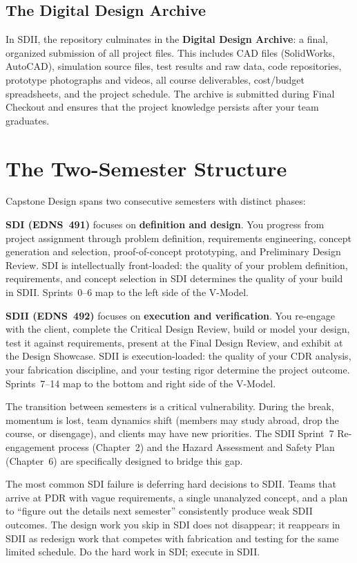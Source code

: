 \subsection{The Digital Design Archive}
In SDII, the repository culminates in the \textbf{Digital Design Archive}: a final, organized submission of all project files. This includes CAD files (SolidWorks, AutoCAD), simulation source files, test results and raw data, code repositories, prototype photographs and videos, all course deliverables, cost/budget spreadsheets, and the project schedule. The archive is submitted during Final Checkout and ensures that the project knowledge persists after your team graduates.


\section{The Two-Semester Structure}
Capstone Design spans two consecutive semesters with distinct phases:

\textbf{SDI (EDNS~491)} focuses on \textbf{definition and design}. You progress from project assignment through problem definition, requirements engineering, concept generation and selection, proof-of-concept prototyping, and Preliminary Design Review. SDI is intellectually front-loaded: the quality of your problem definition, requirements, and concept selection in SDI determines the quality of your build in SDII. Sprints~0--6 map to the left side of the V-Model.

\textbf{SDII (EDNS~492)} focuses on \textbf{execution and verification}. You re-engage with the client, complete the Critical Design Review, build or model your design, test it against requirements, present at the Final Design Review, and exhibit at the Design Showcase. SDII is execution-loaded: the quality of your CDR analysis, your fabrication discipline, and your testing rigor determine the project outcome. Sprints~7--14 map to the bottom and right side of the V-Model.

The transition between semesters is a critical vulnerability. During the break, momentum is lost, team dynamics shift (members may study abroad, drop the course, or disengage), and clients may have new priorities. The SDII Sprint~7 Re-engagement process (Chapter~2) and the Hazard Assessment and Safety Plan (Chapter~6) are specifically designed to bridge this gap.

\begin{warningbox}
The most common SDI failure is deferring hard decisions to SDII. Teams that arrive at PDR with vague requirements, a single unanalyzed concept, and a plan to ``figure out the details next semester'' consistently produce weak SDII outcomes. The design work you skip in SDI does not disappear; it reappears in SDII as redesign work that competes with fabrication and testing for the same limited schedule. Do the hard work in SDI; execute in SDII.
\end{warningbox}


